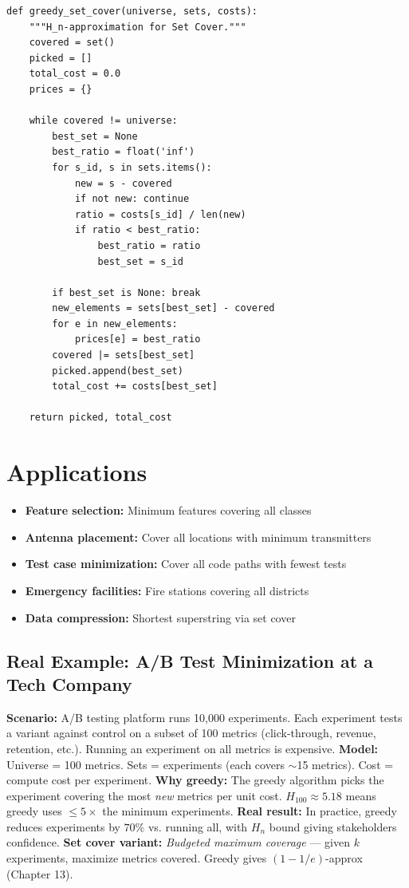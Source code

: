 \documentclass[11pt,oneside]{book}
\begin{document}
\begin{lstlisting}[style=python, caption=Greedy Set Cover]
def greedy_set_cover(universe, sets, costs):
    """H_n-approximation for Set Cover."""
    covered = set()
    picked = []
    total_cost = 0.0
    prices = {}
    
    while covered != universe:
        best_set = None
        best_ratio = float('inf')
        for s_id, s in sets.items():
            new = s - covered
            if not new: continue
            ratio = costs[s_id] / len(new)
            if ratio < best_ratio:
                best_ratio = ratio
                best_set = s_id
        
        if best_set is None: break
        new_elements = sets[best_set] - covered
        for e in new_elements:
            prices[e] = best_ratio
        covered |= sets[best_set]
        picked.append(best_set)
        total_cost += costs[best_set]
    
    return picked, total_cost
\end{lstlisting}

\section{Applications}
\begin{itemize}
    \item \textbf{Feature selection:} Minimum features covering all classes
    \item \textbf{Antenna placement:} Cover all locations with minimum transmitters
    \item \textbf{Test case minimization:} Cover all code paths with fewest tests
    \item \textbf{Emergency facilities:} Fire stations covering all districts
    \item \textbf{Data compression:} Shortest superstring via set cover
\end{itemize}

\subsection*{Real Example: A/B Test Minimization at a Tech Company}
\textbf{Scenario:} A/B testing platform runs 10,000 experiments. Each experiment tests a variant against control on a subset of 100 metrics (click-through, revenue, retention, etc.). Running an experiment on all metrics is expensive.
\textbf{Model:} Universe = 100 metrics. Sets = experiments (each covers $\sim$15 metrics). Cost = compute cost per experiment.
\textbf{Why greedy:} The greedy algorithm picks the experiment covering the most \emph{new} metrics per unit cost. $H_{100} \approx 5.18$ means greedy uses $\leq 5\times$ the minimum experiments.
\textbf{Real result:} In practice, greedy reduces experiments by $70\%$ vs. running all, with $H_n$ bound giving stakeholders confidence.
\textbf{Set cover variant:} \emph{Budgeted maximum coverage} — given $k$ experiments, maximize metrics covered. Greedy gives $(1-1/e)$-approx (Chapter 13).
\end{document}
